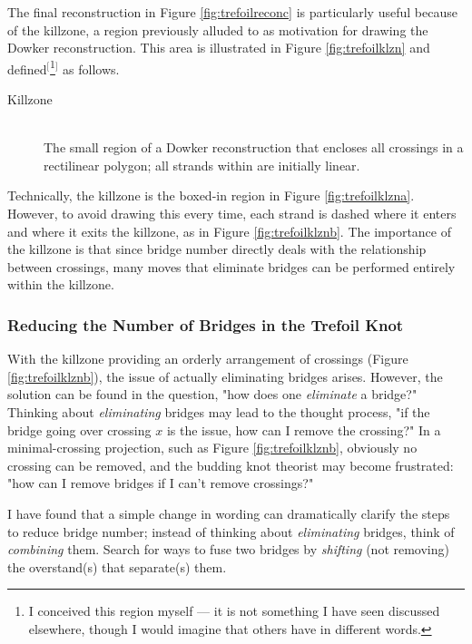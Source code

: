 \documentclass[titlepage]{article}
\begin{document}
The final reconstruction in Figure \ref{fig:trefoilreconc} is particularly useful because of the killzone, a region previously alluded to as motivation for drawing the Dowker reconstruction. This area is illustrated in Figure \ref{fig:trefoilklzn} and defined$^[$\footnote{\label{fnt:credit}I conceived this region myself --- it is not something I have seen discussed elsewhere, though I would imagine that others have in different words.}$^]$ as follows.\par

\begin{defi}
    \begin{description}
        \item[Killzone] \hfill \\ The small region of a Dowker reconstruction that encloses all crossings in a rectilinear polygon; all strands within are initially linear.
    \end{description}
\end{defi}

Technically, the killzone is the boxed-in region in Figure \ref{fig:trefoilklzna}. However, to avoid drawing this every time, each strand is dashed where it enters and where it exits the killzone, as in Figure \ref{fig:trefoilklznb}. The importance of the killzone is that since bridge number directly deals with the relationship between crossings, many moves that eliminate bridges can be performed entirely within the killzone.


\subsubsection{Reducing the Number of Bridges in the Trefoil Knot}\label{ss2:trefoilreduce}
With the killzone providing an orderly arrangement of crossings (Figure \ref{fig:trefoilklznb}), the issue of actually eliminating bridges arises. However, the solution can be found in the question, "how does one \emph{eliminate} a bridge?" Thinking about \emph{eliminating} bridges may lead to the thought process, "if the bridge going over crossing $x$ is the issue, how can I remove the crossing?" In a minimal-crossing projection, such as Figure \ref{fig:trefoilklznb}, obviously no crossing can be removed, and the budding knot theorist may become frustrated: "how can I remove bridges if I can't remove crossings?"\par
I have found that a simple change in wording can dramatically clarify the steps to reduce bridge number; instead of thinking about \emph{eliminating} bridges, think of \emph{combining} them. Search for ways to fuse two bridges by \emph{shifting} (not removing) the overstand(s) that separate(s) them.\par
\end{document}
